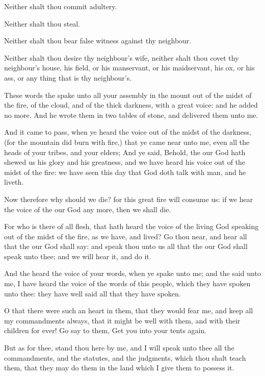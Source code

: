 \verse Neither shalt thou commit adultery.

\verse Neither shalt thou steal.

\verse Neither shalt thou bear false witness against thy neighbour.

\verse Neither shalt thou desire thy neighbour's wife, neither shalt thou covet thy neighbour's house, his field, or his manservant, or his maidservant, his ox, or his ass, or any thing that is thy neighbour's.

\verse These words the \LORD spake unto all your assembly in the mount out of the midst of the fire, of the cloud, and of the thick darkness, with a great voice: and he added no more. And he wrote them in two tables of stone, and delivered them unto me.

\verse And it came to pass, when ye heard the voice out of the midst of the darkness, (for the mountain did burn with fire,) that ye came near unto me, even all the heads of your tribes, and your elders; \verse And ye said, Behold, the \LORD our God hath shewed us his glory and his greatness, and we have heard his voice out of the midst of the fire: we have seen this day that God doth talk with man, and he liveth.

\verse Now therefore why should we die? for this great fire will consume us: if we hear the voice of the \LORD our God any more, then we shall die.

\verse For who is there of all flesh, that hath heard the voice of the living God speaking out of the midst of the fire, as we have, and lived?  \verse Go thou near, and hear all that the \LORD our God shall say: and speak thou unto us all that the \LORD our God shall speak unto thee; and we will hear it, and do it.

\verse And the \LORD heard the voice of your words, when ye spake unto me; and the \LORD said unto me, I have heard the voice of the words of this people, which they have spoken unto thee: they have well said all that they have spoken.

\verse O that there were such an heart in them, that they would fear me, and keep all my commandments always, that it might be well with them, and with their children for ever!  \verse Go say to them, Get you into your tents again.

\verse But as for thee, stand thou here by me, and I will speak unto thee all the commandments, and the statutes, and the judgments, which thou shalt teach them, that they may do them in the land which I give them to possess it.

